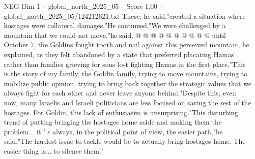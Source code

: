 \begin{textsample}{NEG Dim 1 – global\_north\_2025\_05 – Score 1.00 – global\_north\_2025\_05/124212621.txt}
These, he said,"created a situation where hostages were collateral damages."He continued,"We were challenged by a mountain that we could not move,"he said. @ @ @ @ @ @ @ @ @ @ until October 7, the Goldins fought tooth and nail against this perceived mountain, he explained, as they felt abandoned by a state that preferred placating Hamas rather than families grieving for sons lost fighting Hamas in the first place."This is the story of my family, the Goldin family, trying to move mountains, trying to mobilize public opinion, trying to bring back together the strategic values that we always fight for each other and never leave anyone behind."Despite this, even now, many Israelis and Israeli politicians are less focused on saving the rest of the hostages.
For Goldin, this lack of enthusiasim is unsurprising."This disturbing trend of putting bringing the hostages home aside and making them the problem... it ' s always, in the political point of view, the easier path,"he said."The hardest issue to tackle would be to actually bring hostages home.
The easier thing is... to silence them."

\end{textsample}
